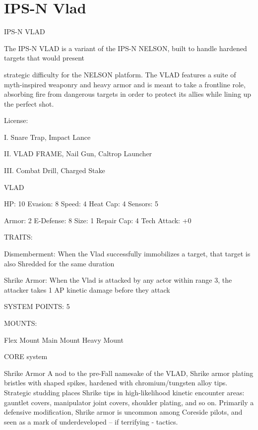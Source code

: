 \section{IPS-N Vlad}

                                                     IPS-N VLAD

The IPS-N VLAD is a variant of the IPS-N NELSON, built to handle hardened targets that would present

strategic difficulty for the NELSON platform. The VLAD features a suite of myth-inspired weaponry and
heavy armor and is meant to take a frontline role, absorbing fire from dangerous targets in order to protect
its allies while lining up the perfect shot.




                                                      License:

I. Snare Trap, Impact Lance

II. VLAD FRAME, Nail Gun, Caltrop Launcher

III. Combat Drill, Charged Stake


                                                       VLAD

  HP: 10          Evasion: 8                              Speed: 4            Heat Cap: 4         Sensors: 5

  Armor: 2        E-Defense: 8                            Size: 1             Repair Cap: 4       Tech Attack:
                                                                                                  +0

                                                      TRAITS:

  Dismemberment: When the Vlad successfully immobilizes a target, that target is also Shredded for the
  same duration

  Shrike Armor: When the Vlad is attacked by any actor within range 3, the attacker takes 1 AP kinetic
  damage before they attack

                                                SYSTEM POINTS: 5

                                                      MOUNTS:

  Flex Mount                          Main Mount                               Heavy Mount

                                                   CORE system

                                                    Shrike Armor
  A nod to the pre-Fall namesake of the VLAD, Shrike armor plating bristles with shaped spikes, hardened
  with chromium/tungsten alloy tips. Strategic studding places Shrike tips in high-likelihood kinetic
  encounter areas: gauntlet covers, manipulator joint covers, shoulder plating, and so on. Primarily a
  defensive modification, Shrike armor is uncommon among Coreside pilots, and seen as a mark of
  underdeveloped -- if terrifying - tactics.

